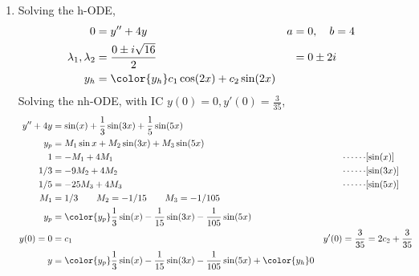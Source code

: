 \begin{enumerate}
    \item Solving the h-ODE,
          \begin{align}
              0                        & = y'' + 4y                                  &
              a                        & = 0, \quad b = 4                              \\
              \lambda_{1}, \lambda_{2} & = \frac{0 \pm i\sqrt{16}}{2}                &
                                       & = 0 \pm 2i                                    \\
              y_{h}                    & = \color{y_h} c_{1}\cos(2x) + c_{2}\sin(2x)
          \end{align}
          Solving the nh-ODE, with IC $ y(0) = 0, y'(0) = \frac{3}{35} $,
          \begin{align}
              y'' + 4y             & = \sin(x) + \frac{1}{3}\sin(3x)
              + \frac{1}{5}\sin(5x)                                            \\
              y_{p}                & = M_{1} \sin x + M_{2}\sin(3x)
              + M_{3}\sin(5x)                                                  \\
              1                    & = -M_{1} + 4M_{1}                       &
              \cdots\cdots         & [\sin(x)]                                 \\
              1/3                  & = -9M_{2} + 4M_{2}                      &
              \cdots\cdots         & [\sin(3x)]                                \\
              1/5                  & = -25M_{3}  + 4M_{3}                    &
              \cdots\cdots         & [\sin(5x)]                                \\
              M_{1}                & = 1/3 \qquad M_{2} = -1/15 \qquad M_{3}
              = -1/105                                                         \\
              y_{p}                & = \color{y_p} \frac{1}{3}\sin(x)
              - \frac{1}{15}\sin(3x)
              - \frac{1}{105}\sin(5x)                                          \\
              y(0) = 0             & = c_{1}                                 &
              y'(0) = \frac{3}{35} & = 2c_{2} + \frac{3}{35}                   \\
              y                    & = {\color{y_p} \frac{1}{3}\sin(x)
              - \frac{1}{15}\sin(3x)
              - \frac{1}{105}\sin(5x)} + {\color{y_h}0}
          \end{align}


\end{enumerate}
